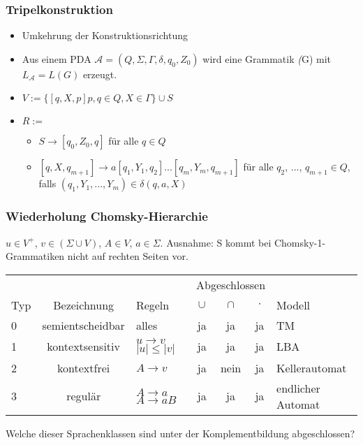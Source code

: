 \documentclass{beamer}
\begin{document}
\begin{frame}
 \frametitle{Tripelkonstruktion}
 \begin{itemize}
  \item Umkehrung der Konstruktionsrichtung
  \item Aus einem PDA $\mathcal{A} = (Q, \Sigma, \Gamma, \delta, q_0, Z_0)$ wird eine Grammatik \textit(G) mit $L_{\mathcal{A}} = L(G)$ erzeugt.
 \end{itemize} 
 \begin{itemize}
  \item $V := \{[q, X, p]p, q \in Q, X \in \Gamma \} \cup S$
  \item $R := $
  \begin{itemize}
   \item $S \rightarrow [q_0, Z_0, q]$ für alle $q \in Q$
   \item $[q, X, q_{m+1}] \rightarrow a[q_1, Y_1, q_2] ... [q_m, Y_m, q_{m+1}]$ für alle $q_2$, ..., $q_{m+1} \in Q$,
   falls $(q_1, Y_1, ..., Y_m) \in \delta(q, a, X)$
  \end{itemize}
 \end{itemize}

\end{frame}


\begin{frame}
 \frametitle{Wiederholung Chomsky-Hierarchie}
 $u \in V^+$, $v \in (\Sigma \cup V)$, $A \in V$, $a \in \Sigma$.
  Ausnahme: S kommt bei Chomsky-1-Grammatiken nicht auf rechten Seiten vor.
 \begin{table}
 \begin{center}
 \begin{tabular}{| l | c | p{1.4cm} | c | c | c | l |}
 \hline
 & & & \multicolumn{3}{|c|}{Abgeschlossen} &\\
 Typ & Bezeichnung & Regeln & $\cup$ & $\cap$ & $\cdot$ & Modell\\ \hline
 0 & semientscheidbar & alles & ja & ja & ja & TM \\ \hline
 1 & kontextsensitiv & $u \rightarrow v$ $|u| \leq |v|$ & ja & ja & ja &  LBA \\ \hline
 2 & kontextfrei & $A \rightarrow v$ & ja & nein & ja & Kellerautomat \\ \hline
 3 & regulär & $A \rightarrow a$  $A \rightarrow aB$ & ja & ja & ja & endlicher Automat \\ \hline
 \end{tabular}
 \end{center}
 \end{table}
\pause
Welche dieser Sprachenklassen sind unter der Komplementbildung abgeschlossen?
\end{frame}
\end{document}
